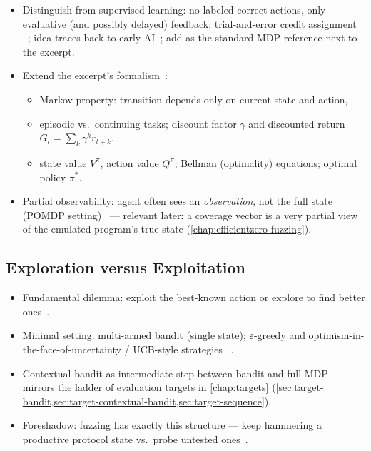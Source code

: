 \begin{itemize}
  \item Distinguish from supervised learning: no labeled correct actions, only evaluative
    (and possibly delayed) feedback; trial-and-error credit assignment
    ~\cite{sutton_reinforcement_2020}; idea traces back to early AI~\cite{minsky_steps_1961};
    add \cite{puterman_markov_2009} as the standard MDP reference next to the excerpt.
  \item Extend the excerpt's formalism~\cite{sutton_reinforcement_2020}:
    \begin{itemize}
      \item Markov property: transition depends only on current state and action,
      \item episodic vs.\ continuing tasks; discount factor $\gamma$ and discounted return
        $G_t = \sum_k \gamma^k r_{t+k}$,
      \item state value $V^\pi$, action value $Q^\pi$; Bellman (optimality) equations;
        optimal policy $\pi^*$.
    \end{itemize}
  \item Partial observability: agent often sees an \emph{observation}, not the full state
    (POMDP setting)~\cite{sutton_reinforcement_2020} --- relevant later: a coverage vector is a
    very partial view of the emulated program's true state
    (\cref{chap:efficientzero-fuzzing}).
\end{itemize}

\subsection{Exploration versus Exploitation}\label{sec:rl-exploration}

\begin{itemize}
  \item Fundamental dilemma: exploit the best-known action or explore to find better
    ones~\cite{sutton_reinforcement_2020}.
  \item Minimal setting: multi-armed bandit (single state); $\varepsilon$-greedy and
    optimism-in-the-face-of-uncertainty / UCB-style strategies
    ~\cite{sutton_reinforcement_2020,hutchison_bandit_2006}.
  \item Contextual bandit as intermediate step between bandit and full MDP ---
    mirrors the ladder of evaluation targets in \cref{chap:targets}
    (\cref{sec:target-bandit,sec:target-contextual-bandit,sec:target-sequence}).
  \item Foreshadow: fuzzing has exactly this structure --- keep hammering a productive protocol
    state vs.\ probe untested ones~\cite{borcherding_bandits_2023}.
\end{itemize}

